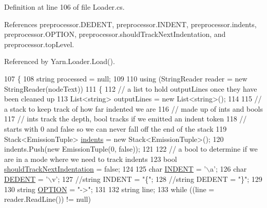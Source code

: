 Definition at line 106 of file Loader.\-cs.



References preprocessor.\-D\-E\-D\-E\-N\-T, preprocessor.\-I\-N\-D\-E\-N\-T, preprocessor.\-indents, preprocessor.\-O\-P\-T\-I\-O\-N, preprocessor.\-should\-Track\-Next\-Indentation, and preprocessor.\-top\-Level.



Referenced by Yarn.\-Loader.\-Load().


\begin{DoxyCode}
107         \{
108             \textcolor{keywordtype}{string} processed = null;
109 
110             \textcolor{keyword}{using} (StringReader reader = \textcolor{keyword}{new} StringReader(nodeText))
111             \{
112                 \textcolor{comment}{// a list to hold outputLines once they have been cleaned up}
113                 List<string> outputLines = \textcolor{keyword}{new} List<string>();
114 
115                 \textcolor{comment}{// a stack to keep track of how far indented we are}
116                 \textcolor{comment}{// made up of ints and bools}
117                 \textcolor{comment}{// ints track the depth, bool tracks if we emitted an indent token}
118                 \textcolor{comment}{// starts with 0 and false so we can never fall off the end of the stack}
119                 Stack<EmissionTuple> \hyperlink{a00348_a00fba9ee9674b2513dbe28eab795b734}{indents} = \textcolor{keyword}{new} Stack<EmissionTuple>();
120                 indents.Push(\textcolor{keyword}{new} EmissionTuple(0, \textcolor{keyword}{false}));
121 
122                 \textcolor{comment}{// a bool to determine if we are in a mode where we need to track indents}
123                 \textcolor{keywordtype}{bool} \hyperlink{a00348_afa485f45ab87bc0f06c1dfc46737c057}{shouldTrackNextIndentation} = \textcolor{keyword}{false};
124 
125                 \textcolor{keywordtype}{char} \hyperlink{a00348_ae3f2190a793ab77428838e58e0e83676}{INDENT} = \textcolor{charliteral}{'\(\backslash\)a'};
126                 \textcolor{keywordtype}{char} \hyperlink{a00348_a83653c3e52fa74614e655a91ad2b7181}{DEDENT} = \textcolor{charliteral}{'\(\backslash\)v'};
127                 \textcolor{comment}{//string INDENT = "\{";}
128                 \textcolor{comment}{//string DEDENT = "\}";}
129 
130                 \textcolor{keywordtype}{string} \hyperlink{a00348_a7ca2dc5371587b21476669a45af013cd}{OPTION} = \textcolor{stringliteral}{"->"};
131 
132                 \textcolor{keywordtype}{string} line;
133                 \textcolor{keywordflow}{while} ((line = reader.ReadLine()) != null)

\end{DoxyCode}
